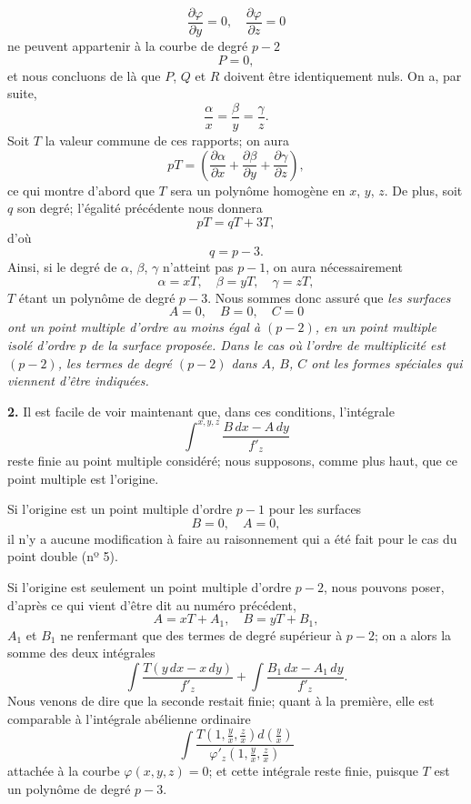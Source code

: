 \documentclass{article}
\begin{document}
\[
\frac{\partial \varphi}{\partial y} = 0, \quad \frac{\partial \varphi}{\partial z} = 0
\]
ne peuvent appartenir à la courbe de degré $p - 2$
\[
P = 0,
\]
et nous concluons de là que $P$, $Q$ et $R$ doivent être identiquement nuls. On a, par suite,
\[
\frac{\alpha}{x} = \frac{\beta}{y} = \frac{\gamma}{z}.
\]
Soit $T$ la valeur commune de ces rapports; on aura
\[
pT = \left( \frac{\partial \alpha}{\partial x} + \frac{\partial \beta}{\partial y} + \frac{\partial \gamma}{\partial z} \right),
\]
ce qui montre d'abord que $T$ sera un polynôme homogène en $x$, $y$, $z$. De plus, soit $q$ son degré; l'égalité précédente nous donnera
\[
pT = qT + 3T,
\]
d'où
\[
q = p - 3.
\]
Ainsi, si le degré de $\alpha$, $\beta$, $\gamma$ n'atteint pas $p - 1$, on aura nécessairement
\[
\alpha = xT, \quad \beta = yT, \quad \gamma = zT,
\]
$T$ étant un polynôme de degré $p - 3$. Nous sommes donc assuré que \emph{les surfaces}
\[
A = 0, \quad B = 0, \quad C = 0
\]
\emph{ont un point multiple d'ordre au moins égal à $(p - 2)$, en un point multiple isolé d'ordre $p$ de la surface proposée. Dans le cas où l'ordre de multiplicité est $(p - 2)$, les termes de degré $(p - 2)$ dans $A$, $B$, $C$ ont les formes spéciales qui viennent d'être indiquées.}

\textbf{2.} Il est facile de voir maintenant que, dans ces conditions, l'intégrale
\[
\int^{x, y, z} \frac{B\,dx - A\,dy}{f'_{z}}
\]
reste finie au point multiple considéré; nous supposons, comme plus haut, que ce point multiple est l'origine.

Si l'origine est un point multiple d'ordre $p - 1$ pour les surfaces
\[
B = 0, \quad A = 0,
\]
il n'y a aucune modification à faire au raisonnement qui a été fait pour le cas du point double (nº 5).

Si l'origine est seulement un point multiple d'ordre $p - 2$, nous pouvons poser, d'après ce qui vient d'être dit au numéro précédent,
\[
A = xT + A_{1}, \quad B = yT + B_{1},
\]
$A_{1}$ et $B_{1}$ ne renfermant que des termes de degré supérieur à $p - 2$; on a alors la somme des deux intégrales
\[
\int \frac{T(y\,dx - x\,dy)}{f'_{z}} + \int \frac{B_{1}\,dx - A_{1}\,dy}{f'_{z}}.
\]
Nous venons de dire que la seconde restait finie; quant à la première, elle est comparable à l'intégrale abélienne ordinaire
\[
\int \frac{T\left(1, \frac{y}{x}, \frac{z}{x}\right) d\left(\frac{y}{x}\right)}{\varphi'_{z}\left(1, \frac{y}{x}, \frac{z}{x}\right)}
\]
attachée à la courbe $\varphi(x, y, z) = 0$; et cette intégrale reste finie, puisque $T$ est un polynôme de degré $p - 3$.
\end{document}
